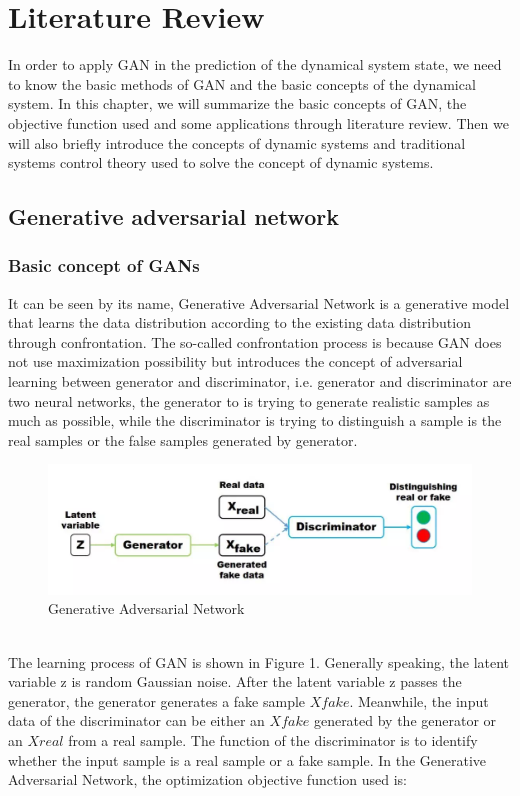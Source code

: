 \documentclass[11pt,a4paper]{article}
\begin{document}
\section{Literature Review}
In order to apply GAN in the prediction of the dynamical system state, we need to know the basic methods of GAN and the basic concepts of the dynamical system. In this chapter, we will summarize the basic concepts of GAN, the objective function used and some applications through literature review. Then we will also briefly introduce the concepts of dynamic systems and traditional systems control theory used to solve the concept of dynamic systems.
\subsection{Generative adversarial network}
\subsubsection{Basic concept of GANs}
It can be seen by its name, Generative Adversarial Network is a generative model that learns the data distribution according to the existing data distribution through confrontation. The so-called confrontation process is because GAN does not use maximization possibility but introduces the concept of adversarial learning between generator and discriminator, i.e. generator and discriminator are two neural networks, the generator to is trying to generate realistic samples as much as possible, while the discriminator is trying to distinguish a sample is the real samples or the false samples generated by generator.
\\
\begin{figure}[ht!]
\centering
\includegraphics[scale=0.3]{1.png}
\caption{Generative Adversarial Network\citep{hong2019generative}}
\label{fig:GAN}
\end{figure}
\\
The learning process of GAN is shown in Figure 1. Generally speaking, the latent variable z is random Gaussian noise. After the latent variable z passes the generator, the generator generates a fake sample $Xfake$. Meanwhile, the input data of the discriminator can be either an $Xfake$ generated by the generator or an $Xreal$ from a real sample. The function of the discriminator is to identify whether the input sample is a real sample or a fake sample. In the Generative Adversarial Network\citep{goodfellow2014generative}, the optimization objective function used is:
\end{document}
